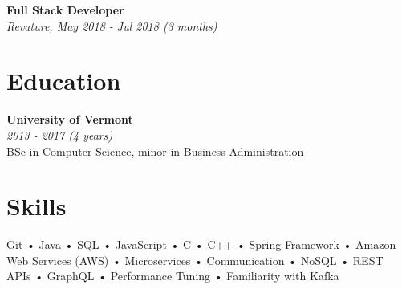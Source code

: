 \documentclass[a4paper,10pt]{article}
\begin{document}
\noindent
\textbf{Full Stack Developer}\\
\textit{Revature, May 2018 - Jul 2018 (3 months)}

\section*{Education}
\noindent
\textbf{University of Vermont}\\
\textit{2013 - 2017 (4 years)}\\
BSc in Computer Science, minor in Business Administration

\section*{Skills}
Git • Java • SQL • JavaScript • C • C++ • Spring Framework • Amazon Web Services (AWS) • Microservices • Communication • NoSQL • REST APIs • GraphQL • Performance Tuning • Familiarity with Kafka
\end{document}
